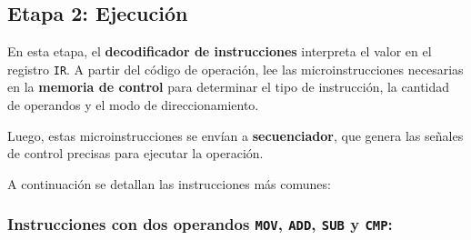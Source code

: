 \documentclass[12pt,oneside]{templates/unerthesis}
\begin{document}
\hypertarget{etapa-2-ejecuciuxf3n}{%
\subsection{Etapa 2: Ejecución}\label{etapa-2-ejecuciuxf3n}}

En esta etapa, el \textbf{decodificador de instrucciones} interpreta el valor en el registro \texttt{IR}. A partir del código de operación, lee las microinstrucciones necesarias en la \textbf{memoria de control} para determinar el tipo de instrucción, la cantidad de operandos y el modo de direccionamiento.

Luego, estas microinstrucciones se envían a \textbf{secuenciador}, que genera las señales de control precisas para ejecutar la operación.

A continuación se detallan las instrucciones más comunes:

\hypertarget{instrucciones-con-dos-operandos-mov-add-sub-y-cmp}{%
\subsubsection{\texorpdfstring{Instrucciones con dos operandos \texttt{MOV}, \texttt{ADD}, \texttt{SUB} y \texttt{CMP}:}{Instrucciones con dos operandos MOV, ADD, SUB y CMP:}}\label{instrucciones-con-dos-operandos-mov-add-sub-y-cmp}}
\end{document}
